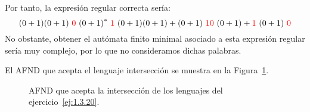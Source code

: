\begin{ejercicio}
\begin{description}
\begin{observacion}
            Por tanto, la expresión regular correcta sería:
            \begin{equation*}
                (0+1)(0+1) \ \red{0}\  {(0+1)}^{\ast} \ \red{1}\ (0+1)(0+1)
                + (0+1) \ \red{10} \ (0+1)
                + \red{1} \ (0+1) \ \red{0}
            \end{equation*}
            No obstante, obtener el autómata finito minimal asociado a esta expresión regular sería muy complejo, por lo que no consideramos dichas palabras.
        \end{observacion}

        El AFND que acepta el lenguaje intersección se muestra en la Figura~\ref{fig:ej:1.3.20:AFND-Interseccion}.
        \begin{figure}
            \centering
            \caption{AFND que acepta la intersección de los lenguajes del ejercicio~\ref{ej:1.3.20}.}
            \label{fig:ej:1.3.20:AFND-Interseccion}
        \end{figure}


\end{description}
\end{ejercicio}
